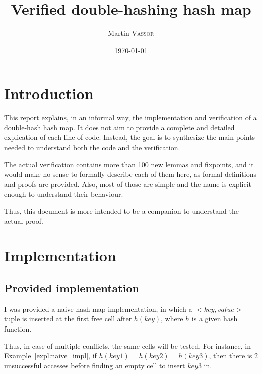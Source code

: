 \documentclass[oneside]{article}
\title{Verified double-hashing hash map}
\author{Martin \textsc{Vassor}}
\date{\today}
\begin{document}
\maketitle

\section{Introduction}
This report explains, in an informal way, the implementation and verification of a double-hash hash map. It does not aim to provide a complete and detailed explication of each line of code. Instead, the goal is to synthesize the main points needed to understand both the code and the verification.

The actual verification contains more than 100 new lemmas and fixpoints, and it would make no sense to formally describe each of them here, as formal definitions and proofs are provided. Also, most of those are simple and the name is explicit enough to understand their behaviour.

Thus, this document is more intended to be a companion to understand the actual proof.


\section{Implementation}
\subsection{Provided implementation}
I was provided a naive hash map implementation, in which a $<key, value>$ tuple is inserted at the first free cell after $h(key)$, where $h$ is a given hash function.

Thus, in case of multiple conflicts, the same cells will be tested. For instance, in Example~\ref{expl:naive_impl}, if $h(key1) = h(key2) = h(key3)$, then there is $2$ unsuccessful accesses before finding an empty cell to insert $key3$ in.
\end{document}
